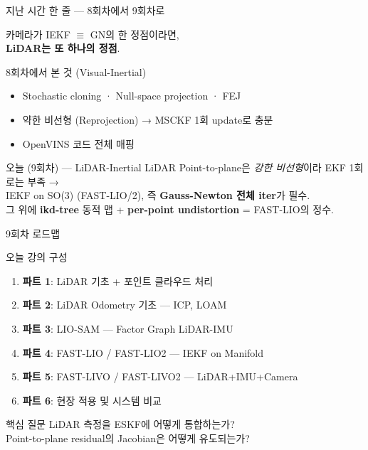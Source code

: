 \begin{frame}{지난 시간 한 줄 — 8회차에서 9회차로}
  \begin{center}\large
    카메라가 IEKF $\equiv$ GN의 한 정점이라면,\\
    \textbf{LiDAR는 또 하나의 정점}.
  \end{center}
  \vspace{0.3em}
  \begin{block}{\small 8회차에서 본 것 (Visual-Inertial)}
    \begin{itemize}
      \item Stochastic cloning · Null-space projection · FEJ
      \item 약한 비선형 (Reprojection) → MSCKF 1회 update로 충분
      \item OpenVINS 코드 전체 매핑
    \end{itemize}
  \end{block}
  \pause
  \begin{exampleblock}{오늘 (9회차) — LiDAR-Inertial}
    LiDAR Point-to-plane은 \emph{강한 비선형}이라 EKF 1회로는 부족 →\\
    \alert{IEKF on SO(3) (FAST-LIO/2)}, 즉 \textbf{Gauss-Newton 전체 iter}가 필수.\\
    그 위에 \textbf{ikd-tree} 동적 맵 + \textbf{per-point undistortion} = FAST-LIO의 정수.
  \end{exampleblock}
\end{frame}


\begin{frame}{9회차 로드맵}
  \begin{block}{오늘 강의 구성}
    \begin{enumerate}
      \item \textbf{파트 1}: LiDAR 기초 + 포인트 클라우드 처리
      \item \textbf{파트 2}: LiDAR Odometry 기초 — ICP, LOAM
      \item \textbf{파트 3}: LIO-SAM — Factor Graph LiDAR-IMU
      \item \textbf{파트 4}: FAST-LIO / FAST-LIO2 — IEKF on Manifold
      \item \textbf{파트 5}: FAST-LIVO / FAST-LIVO2 — LiDAR+IMU+Camera
      \item \textbf{파트 6}: 현장 적용 및 시스템 비교
    \end{enumerate}
  \end{block}
  \pause
  \begin{alertblock}{핵심 질문}
    LiDAR 측정을 ESKF에 어떻게 통합하는가?\\
    Point-to-plane residual의 Jacobian은 어떻게 유도되는가?
  \end{alertblock}
\end{frame}

